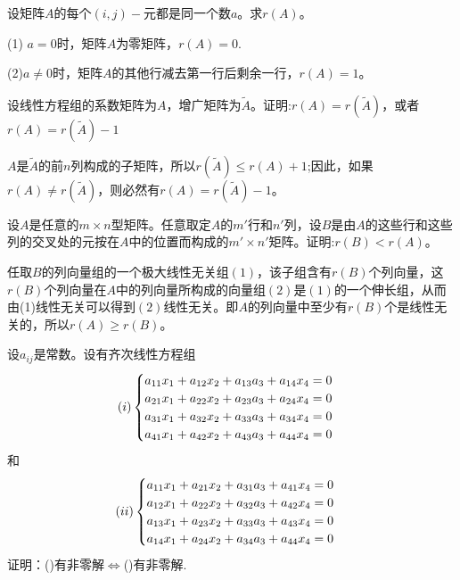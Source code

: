 \documentclass[a4paper]{report}
\begin{document}
\EX 设矩阵$A$的每个$(i,j)-$元都是同一个数$a$。求$r(A)$。

\begin{jie}
(1) $a=0$时，矩阵$A$为零矩阵，$r(A)=0$.

(2)$a\neq 0$时，矩阵$A$的其他行减去第一行后剩余一行，$r(A)=1$。
\end{jie}

\EX 设线性方程组的系数矩阵为$A$，增广矩阵为$\widetilde{A}$。证明:$r(A)=r(\widetilde{A})$，或者$r(A)=r(\widetilde{A})-1$

\begin{zhengming}
$A$是$\widetilde{A}$的前$n$列构成的子矩阵，所以$r(\widetilde{A})\leq r(A)+1$;因此，如果$r(A)\neq r(\widetilde{A})$，则必然有$r(A)=r(\widetilde{A})-1$。
\end{zhengming}

\EX 设$A$是任意的$m\times n$型矩阵。任意取定$A$的$m'$行和$n'$列，设$B$是由$A$的这些行和这些列的交叉处的元按在$A$中的位置而构成的$m'\times n'$矩阵。证明:$r(B)<r(A)$。

\begin{zhengming}
任取$B$的列向量组的一个极大线性无关组$(1)$，该子组含有$r(B)$个列向量，这$r(B)$个列向量在$A$中的列向量所构成的向量组$(2)$是$(1)$的一个伸长组，从而由(1)线性无关可以得到$(2)$线性无关。即$A$的列向量中至少有$r(B)$个是线性无关的，所以$r(A)\geq r(B)$。
\end{zhengming}

\EX 设$a_{ij}$是常数。设有齐次线性方程组
\begin{equation*}
  (\uppercase\expandafter{\romannumeral1})
\begin{cases}
a_{11}x_1+a_{12}x_2+a_{13}a_3+a_{14}x_{4}=0\\
a_{21}x_1+a_{22}x_2+a_{23}a_3+a_{24}x_{4}=0\\
a_{31}x_1+a_{32}x_2+a_{33}a_3+a_{34}x_{4}=0\\
a_{41}x_1+a_{42}x_2+a_{43}a_3+a_{44}x_{4}=0
\end{cases}
\end{equation*}
和\begin{equation*}
  (\uppercase\expandafter{\romannumeral2})
\begin{cases}
a_{11}x_1+a_{21}x_2+a_{31}a_3+a_{41}x_{4}=0\\
a_{12}x_1+a_{22}x_2+a_{32}a_3+a_{42}x_{4}=0\\
a_{13}x_1+a_{23}x_2+a_{33}a_3+a_{43}x_{4}=0\\
a_{14}x_1+a_{24}x_2+a_{34}a_3+a_{44}x_{4}=0
\end{cases}
\end{equation*}
证明：(\uppercase\expandafter{})有非零解$\Leftrightarrow$(\uppercase\expandafter{})有非零解.
\end{document}
